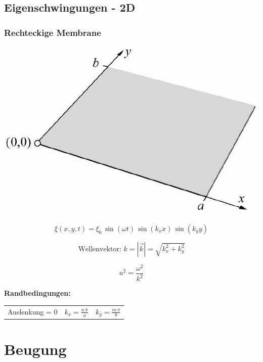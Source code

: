 \subsection{Eigenschwingungen - 2D}

\subsubsection{Rechteckige Membrane}


\begin{minipage}{0.3\linewidth}
\includegraphics[width=0.98\linewidth]{Bilder/Wellen-Optik/membrane} \\
\end{minipage}
\hfill
\begin{minipage}{0.68\linewidth}
$$ \boxed{ \xi(x,y,t) = \xi_0 \, \sin(\omega t) \, \sin(k_x x) \, \sin(k_y y)  } $$

$$ \boxed{ \text{Wellenvektor: } k = |\vec{k}| = \sqrt{k_x^2 + k_y^2}} $$

$$ \boxed{ u^2 = \frac{\omega^2}{k^2}} $$

\end{minipage}

\textbf{Randbedingungen:} \\
\vspace{0.1cm}

\begin{tabular}{l c c }
Auslenkung = 0 &  $ \boxed{ k_x = \frac{n \, \pi}{a} }$ & $ \boxed{ k_y = \frac{m \, \pi}{b} }$
\end{tabular} 





\section{Beugung}


